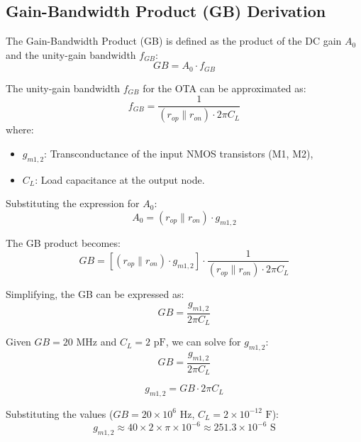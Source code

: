 \subsection{Gain-Bandwidth Product (GB) Derivation}
The Gain-Bandwidth Product (GB) is defined as the product of the DC gain $A_0$ and the unity-gain bandwidth $f_{GB}$:
\begin{equation}
    GB = A_0 \cdot f_{GB}
\end{equation}

The unity-gain bandwidth $f_{GB}$ for the OTA can be approximated as:
\begin{equation}
    f_{GB} = \frac{1}{(r_{op} \parallel r_{on}) \cdot 2\pi C_L}
\end{equation}
where:
\begin{itemize}
    \item $g_{m1,2}$: Transconductance of the input NMOS transistors (M1, M2),
    \item $C_L$: Load capacitance at the output node.
\end{itemize}

Substituting the expression for $A_0$:
\begin{equation}
    A_0 = (r_{op} \parallel r_{on}) \cdot g_{m1,2}
\end{equation}

The GB product becomes:
\begin{equation}
    GB = \left[ (r_{op} \parallel r_{on}) \cdot g_{m1,2} \right] \cdot \frac{1}{(r_{op} \parallel r_{on}) \cdot 2\pi C_L}
\end{equation}

Simplifying, the GB can be expressed as:
\begin{equation}
    GB = \frac{g_{m1,2}}{2\pi C_L}
\end{equation}

Given $GB = 20 \text{ MHz}$ and $C_L = 2 \text{ pF}$, we can solve for $g_{m1,2}$:
\begin{equation}
    GB = \frac{g_{m1,2}}{2\pi C_L}
\end{equation}

\begin{equation}
    g_{m1,2} = GB \cdot 2\pi C_L
\end{equation}

Substituting the values ($GB = 20 \times 10^6 \text{ Hz}$, $C_L = 2 \times 10^{-12} \text{ F}$):
\begin{equation}
    g_{m1,2} \approx 40 \times 2 \times \pi \times 10^{-6} \approx 251.3 \times 10^{-6} \text{ S}
\end{equation}

